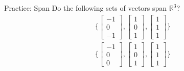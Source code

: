 \begin{frame}{Practice: Span}
    Do the following sets of vectors span $\mathbb{R}^3$?
    \begin{align*}
        \bigg\{
            \begin{bmatrix} -1 \\ 0 \\ -1 \end{bmatrix},
            \begin{bmatrix} 1 \\ 0 \\ 1 \end{bmatrix},
            \begin{bmatrix} 1 \\ 1 \\ 1 \end{bmatrix} 
        \bigg\} \\
        \bigg\{
            \begin{bmatrix} -1 \\ 0 \\ 0 \end{bmatrix},
            \begin{bmatrix} 1 \\ 0 \\ 1 \end{bmatrix},
            \begin{bmatrix} 1 \\ 1 \\ 1 \end{bmatrix} 
        \bigg\}
    \end{align*}
\end{frame}

